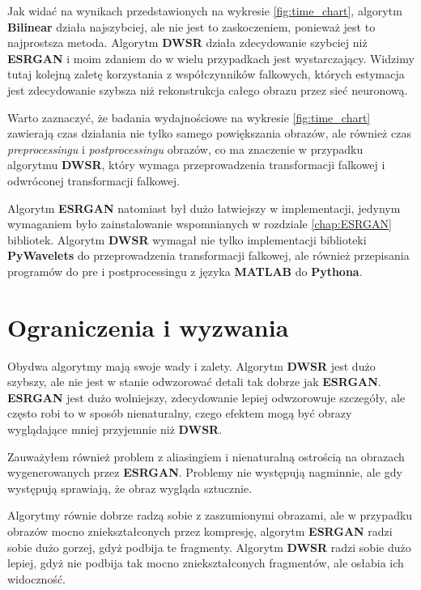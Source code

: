Jak widać na wynikach przedstawionych na wykresie \ref{fig:time_chart}, algorytm \textbf{Bilinear} działa najszybciej, ale nie jest to zaskoczeniem, ponieważ jest to najprostsza metoda. Algorytm \textbf{DWSR} działa zdecydowanie szybciej niż \textbf{ESRGAN} i moim zdaniem do w wielu przypadkach jest wystarczający. Widzimy tutaj kolejną zaletę korzystania z współczynników falkowych, których estymacja jest zdecydowanie szybsza niż rekonstrukcja całego obrazu przez sieć neuronową.

Warto zaznaczyć, że badania wydajnościowe na wykresie \ref{fig:time_chart} zawierają czas działania nie tylko samego powiększania obrazów, ale również czas \textit{preprocessingu} i \textit{postprocessingu} obrazów, co ma znaczenie w przypadku algorytmu \textbf{DWSR}, który wymaga przeprowadzenia transformacji falkowej i odwróconej transformacji falkowej.

Algorytm \textbf{ESRGAN} natomiast był dużo łatwiejszy w implementacji, jedynym wymaganiem było zainstalowanie wspomnianych w rozdziale \ref{chap:ESRGAN} bibliotek. Algorytm \textbf{DWSR} wymagał nie tylko implementacji biblioteki \textbf{PyWavelets} do przeprowadzenia transformacji falkowej, ale również przepisania programów do pre i postprocessingu z języka \textbf{MATLAB} do \textbf{Pythona}.


\newpage
\section{Ograniczenia i wyzwania}

Obydwa algorytmy mają swoje wady i zalety. Algorytm \textbf{DWSR} jest dużo szybszy, ale nie jest w stanie odwzorować detali tak dobrze jak \textbf{ESRGAN}. \textbf{ESRGAN} jest dużo wolniejszy, zdecydowanie lepiej odwzorowuje szczegóły, ale często robi to w sposób nienaturalny, czego efektem mogą być obrazy wyglądające mniej przyjemnie niż \textbf{DWSR}. 

Zauważyłem również problem z aliasingiem i nienaturalną ostrością na obrazach wygenerowanych przez \textbf{ESRGAN}. Problemy nie występują nagminnie, ale gdy występują sprawiają, że obraz wygląda sztucznie.

Algorytmy równie dobrze radzą sobie z zaszumionymi obrazami, ale w przypadku obrazów mocno zniekształconych przez kompresję, algorytm \textbf{ESRGAN} radzi sobie dużo gorzej, gdyż podbija te fragmenty. Algorytm \textbf{DWSR} radzi sobie dużo lepiej, gdyż nie podbija tak mocno zniekształconych fragmentów, ale osłabia ich widoczność.